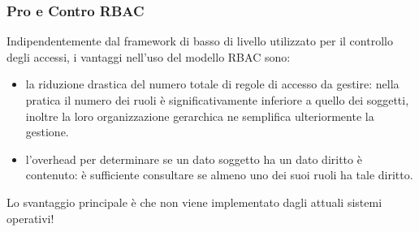\subsubsection{Pro e Contro RBAC}
Indipendentemente dal framework di basso di livello utilizzato per il controllo degli accessi, i vantaggi nell'uso del modello RBAC sono:
\begin{itemize} 
  \item la riduzione drastica del numero totale di regole di accesso da gestire: nella pratica il numero dei ruoli è significativamente inferiore a quello dei soggetti, inoltre la loro organizzazione gerarchica ne semplifica ulteriormente la gestione.
  \item l'overhead per determinare se un dato soggetto ha un dato diritto è contenuto: è sufficiente consultare se almeno uno dei suoi ruoli ha tale diritto.
\end{itemize}
Lo svantaggio principale è che non viene implementato dagli attuali sistemi operativi!
